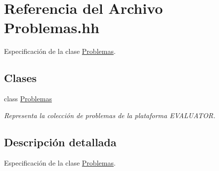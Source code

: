 \hypertarget{_problemas_8hh}{}\section{Referencia del Archivo Problemas.\+hh}
\label{_problemas_8hh}


Especificación de la clase \mbox{\hyperlink{class_problemas}{Problemas}}.  


\subsection*{Clases}
\begin{DoxyCompactItemize}
\item 
class \mbox{\hyperlink{class_problemas}{Problemas}}
\begin{DoxyCompactList}\small\item\em Representa la colección de problemas de la plataforma E\+V\+A\+L\+U\+A\+T\+OR. \end{DoxyCompactList}\end{DoxyCompactItemize}


\subsection{Descripción detallada}
Especificación de la clase \mbox{\hyperlink{class_problemas}{Problemas}}. 

